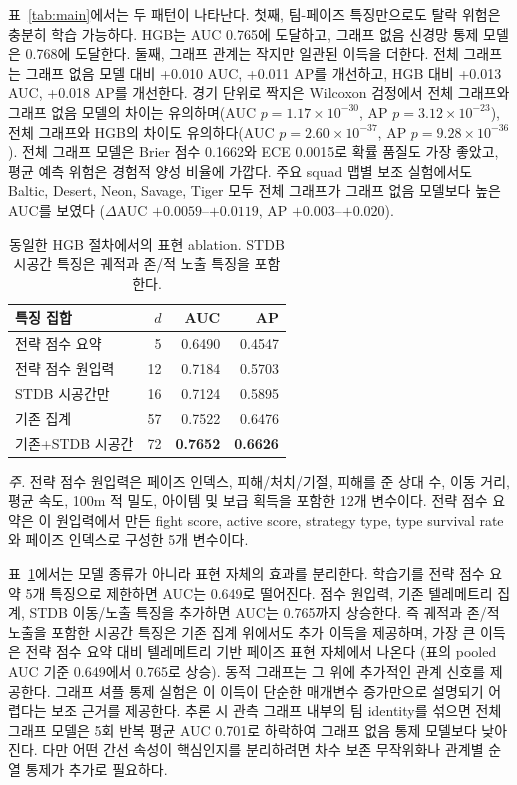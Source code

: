 표~\ref{tab:main}에서는 두 패턴이 나타난다. 첫째, 팀-페이즈 특징만으로도
탈락 위험은 충분히 학습 가능하다. HGB는 AUC 0.765에 도달하고, 그래프 없음
신경망 통제 모델은 0.768에 도달한다. 둘째, 그래프 관계는 작지만 일관된
이득을 더한다. 전체 그래프는 그래프 없음 모델 대비 +0.010 AUC, +0.011 AP를
개선하고, HGB 대비 +0.013 AUC, +0.018 AP를 개선한다. 경기 단위로 짝지은
Wilcoxon 검정에서 전체 그래프와 그래프 없음 모델의 차이는 유의하며(AUC
\(p=1.17\times10^{-30}\), AP \(p=3.12\times10^{-23}\)), 전체 그래프와 HGB의
차이도 유의하다(AUC \(p=2.60\times10^{-37}\), AP
\(p=9.28\times10^{-36}\)). 전체 그래프 모델은 Brier 점수 0.1662와 ECE
0.0015로 확률 품질도 가장 좋았고, 평균 예측 위험은 경험적 양성
비율에 가깝다. 주요 squad 맵별 보조 실험에서도 Baltic, Desert, Neon,
Savage, Tiger 모두 전체 그래프가 그래프 없음 모델보다 높은 AUC를 보였다
(\(\Delta\)AUC \(+0.0059\)--\(+0.0119\), AP \(+0.003\)--\(+0.020\)).

\begin{table}[htbp]
\centering
\caption{동일한 HGB 절차에서의 표현 ablation. STDB 시공간 특징은
궤적과 존/적 노출 특징을 포함한다.}
\label{tab:repr}
\small
\begin{tabular}{lrrr}
\toprule
특징 집합 & \(d\) & AUC & AP \\
\midrule
전략 점수 요약 & 5 & 0.6490 & 0.4547 \\
전략 점수 원입력 & 12 & 0.7184 & 0.5703 \\
STDB 시공간만 & 16 & 0.7124 & 0.5895 \\
기존 집계 & 57 & 0.7522 & 0.6476 \\
기존+STDB 시공간 & 72 & \textbf{0.7652} & \textbf{0.6626} \\
\bottomrule
\end{tabular}
\vspace{2pt}
\begin{minipage}{0.96\linewidth}
\scriptsize
\textit{주.} 전략 점수 원입력은 페이즈 인덱스, 피해/처치/기절, 피해를 준
상대 수, 이동 거리, 평균 속도, 100m 적 밀도, 아이템 및 보급 획득을 포함한
12개 변수이다. 전략 점수 요약은 이 원입력에서 만든 fight score, active
score, strategy type, type survival rate와 페이즈 인덱스로 구성한 5개
변수이다.
\end{minipage}
\end{table}

표~\ref{tab:repr}에서는 모델 종류가 아니라 표현 자체의 효과를 분리한다.
학습기를 전략 점수 요약 5개 특징으로 제한하면 AUC는 0.649로
떨어진다. 점수 원입력, 기존 텔레메트리 집계, STDB 이동/노출 특징을
추가하면 AUC는 0.765까지 상승한다. 즉 궤적과 존/적 노출을 포함한
시공간 특징은 기존 집계 위에서도 추가 이득을 제공하며, 가장 큰 이득은
전략 점수 요약 대비 텔레메트리 기반 페이즈 표현 자체에서 나온다
(표의 pooled AUC 기준 0.649에서 0.765로 상승).
동적 그래프는 그 위에 추가적인 관계 신호를 제공한다. 그래프 셔플 통제 실험은
이 이득이 단순한 매개변수 증가만으로 설명되기 어렵다는 보조 근거를 제공한다.
추론 시 관측 그래프 내부의 팀 identity를 섞으면 전체 그래프 모델은 5회 반복
평균 AUC 0.701로 하락하여 그래프 없음 통제 모델보다 낮아진다. 다만 어떤 간선
속성이 핵심인지를 분리하려면 차수 보존 무작위화나 관계별 순열 통제가
추가로 필요하다.

